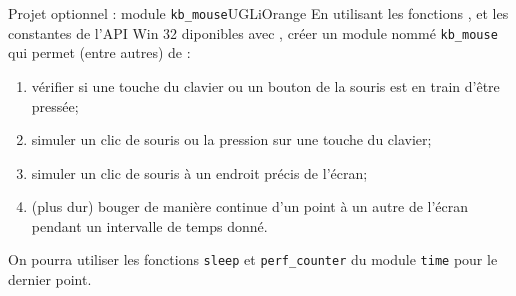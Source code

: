 \documentclass[a4paper,12pt,french]{book}
\begin{document}
\begin{encadrecolore}{Projet optionnel : module \texttt{kb\_mouse}}{UGLiOrange}
En utilisant les fonctions ,   et les constantes  de l'API Win 32 diponibles avec , créer un module nommé \texttt{kb\_mouse}
 qui permet (entre autres) de :
 \begin{enumerate}[--]
 	\item 	vérifier si une touche du clavier ou un bouton de la souris est en train d'être pressée;
 	\item 	simuler un clic de souris ou la pression sur une touche du clavier;
 	\item 	simuler un clic de souris à un endroit précis de l'écran;
 	\item	(plus dur) bouger de manière continue d'un point à un autre de l'écran pendant un intervalle de temps donné.
 \end{enumerate}
On pourra utiliser les fonctions \texttt{sleep} et \texttt{perf\_counter} du module \texttt{time} pour le dernier point.
\end{encadrecolore}
\end{document}
